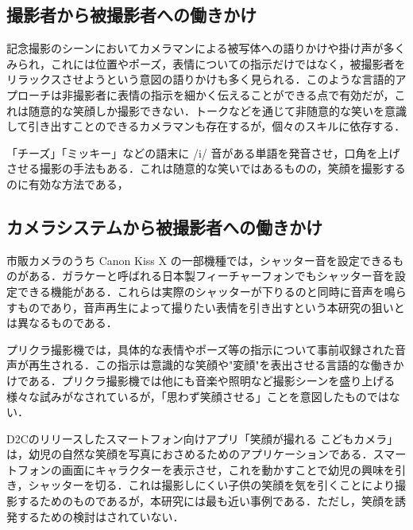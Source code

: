 \documentclass[submit,techreq]{ec2014}
\begin{document}
\subsection{撮影者から被撮影者への働きかけ}

記念撮影のシーンにおいてカメラマンによる被写体への語りかけや掛け声が多くみられ，これには位置やポーズ，表情についての指示だけではなく，被撮影者をリラックスさせようという意図の語りかけも多く見られる．このような言語的アプローチは非撮影者に表情の指示を細かく伝えることができる点で有効だが，これは随意的な笑顔しか撮影できない．トークなどを通じて非随意的な笑いを意識して引き出すことのできるカメラマンも存在するが，個々のスキルに依存する．

「チーズ」「ミッキー」などの語末に /i/ 音がある単語を発音させ，口角を上げさせる撮影の手法もある．これは随意的な笑いではあるものの，笑顔を撮影するのに有効な方法である，

\subsection{カメラシステムから被撮影者への働きかけ}


市販カメラのうち Canon Kiss X の一部機種では，シャッター音を設定できるものがある\cite{canonkissx}．ガラケーと呼ばれる日本製フィーチャーフォンでもシャッター音を設定できる機能がある．これらは実際のシャッターが下りるのと同時に音声を鳴らすものであり，音声再生によって撮りたい表情を引き出すという本研究の狙いとは異なるものである．

プリクラ撮影機では，具体的な表情やポーズ等の指示について事前収録された音声が再生される．この指示は意識的な笑顔や"変顔"を表出させる言語的な働きかけである．プリクラ撮影機では他にも音楽や照明など撮影シーンを盛り上げる様々な試みがなされているが，「思わず笑顔させる」ことを意図したものではない．

D2Cのリリースしたスマートフォン向けアプリ「笑顔が撮れる こどもカメラ」は，幼児の自然な笑顔を写真におさめるためのアプリケーションである．スマートフォンの画面にキャラクターを表示させ，これを動かすことで幼児の興味を引き，シャッターを切る．これは撮影しにくい子供の笑顔を気を引くことにより撮影するためのものであるが，本研究には最も近い事例である．ただし，笑顔を誘発するための検討はされていない．


\end{document}
